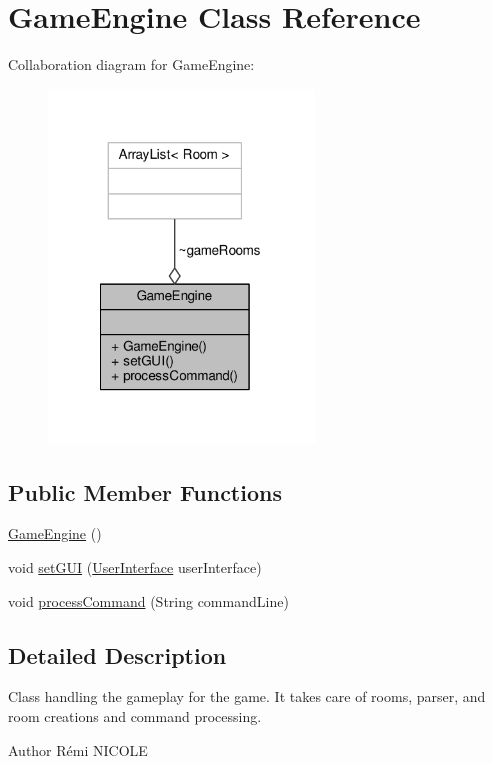 \hypertarget{classGameEngine}{\section{Game\-Engine Class Reference}
\label{classGameEngine}
}


Collaboration diagram for Game\-Engine\-:\nopagebreak
\begin{figure}[H]
\begin{center}
\leavevmode
\includegraphics[width=200pt]{classGameEngine__coll__graph}
\end{center}
\end{figure}
\subsection*{Public Member Functions}
\begin{DoxyCompactItemize}
\item 
\hyperlink{classGameEngine_a9e8a92f5021a34293060f9aaff4005de}{Game\-Engine} ()
\item 
void \hyperlink{classGameEngine_aec901a5b590b3cd204f196165da5dfb6}{set\-G\-U\-I} (\hyperlink{classUserInterface}{User\-Interface} user\-Interface)
\item 
void \hyperlink{classGameEngine_ad7133885f313fa99bca3bb7cb8272f64}{process\-Command} (String command\-Line)
\end{DoxyCompactItemize}


\subsection{Detailed Description}
Class handling the gameplay for the game. It takes care of rooms, parser, and room creations and command processing. \begin{DoxyAuthor}{Author}
Rémi N\-I\-C\-O\-L\-E 
\end{DoxyAuthor}


